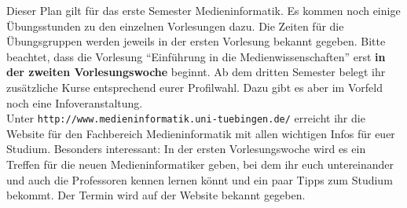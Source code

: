 Dieser Plan gilt für das erste Semester Medieninformatik. 
Es kommen noch einige Übungsstunden
zu den einzelnen Vorlesungen dazu. Die Zeiten für die Übungsgruppen werden jeweils in der ersten Vorlesung bekannt gegeben.
Bitte beachtet, dass die Vorlesung "`Einführung in die Medienwissenschaften"' erst \textbf{in der zweiten Vorlesungswoche} beginnt.
Ab dem dritten Semester belegt ihr zusätzliche Kurse entsprechend eurer Profilwahl. Dazu gibt es aber im Vorfeld noch eine Infoveranstaltung.\\
Unter \texttt{http://www.medieninformatik.uni-tuebingen.de/} erreicht ihr die Website für den Fachbereich Medieninformatik mit allen wichtigen Infos für euer Studium. Besonders interessant: In der ersten Vorlesungswoche wird es ein Treffen für die neuen Medieninformatiker geben, bei dem ihr euch untereinander und auch die Professoren kennen lernen könnt und ein paar Tipps zum Studium bekommt. Der Termin wird auf der Website bekannt gegeben. %
